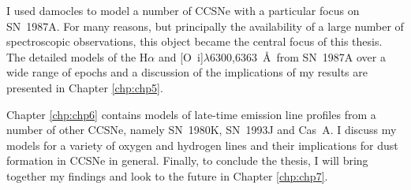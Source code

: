 I used {\sc damocles} to model a number of CCSNe with a particular focus on SN~1987A.  For many reasons, but principally the availability of a large number of spectroscopic observations, this object became the central focus of this thesis. The detailed models of the H$\alpha$ and [O~{\sc i}]$\lambda$6300,6363~\AA\ from SN~1987A over a wide range of epochs and a discussion of the implications of my results are presented in Chapter \ref{chp:chp5}.  

Chapter \ref{chp:chp6} contains models of late-time emission line profiles from a number of other CCSNe, namely SN~1980K, SN~1993J and Cas~A.  I discuss my models for a variety of oxygen and hydrogen lines and their implications for dust formation in CCSNe in general.  Finally, to conclude the thesis, I will bring together my findings and look to the future in Chapter \ref{chp:chp7}.

